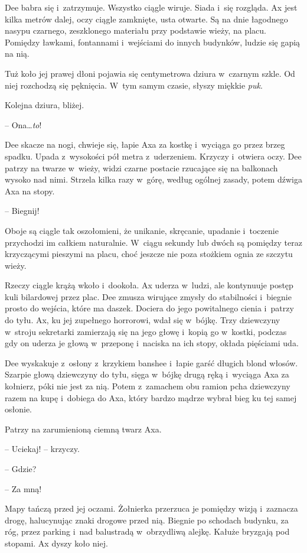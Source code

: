 \documentclass[oneside,polish,11pt,sfheadings]{mwbk}
\begin{document}
Dee babra się i~zatrzymuje. Wszystko ciągle wiruje. Siada i~się
rozgląda. Ax jest kilka metrów dalej, oczy ciągle zamknięte, usta
otwarte. Są na dnie łagodnego nasypu czarnego, zeszklonego materiału
przy podstawie wieży, na placu. Pomiędzy ławkami, fontannami i~wejściami
do innych budynków, ludzie się gapią na nią.

Tuż koło jej prawej dłoni pojawia się centymetrowa dziura w~czarnym
szkle. Od niej rozchodzą się pęknięcia. W~tym samym czasie, słyszy
miękkie \emph{puk}.

Kolejna dziura, bliżej.

-- Ona\ldots \emph{to}!

Dee skacze na nogi, chwieje się, łapie Axa za kostkę i~wyciąga go przez
brzeg spadku. Upada z~wysokości pół metra z~uderzeniem. Krzyczy i~otwiera oczy. Dee patrzy na twarze w~wieży, widzi czarne postacie
rzucające się na balkonach wysoko nad nimi. Strzela kilka razy w~górę,
według ogólnej zasady, potem dźwiga Axa na stopy.

-- Biegnij!

Oboje są ciągle tak oszołomieni, że unikanie, skręcanie, upadanie i~toczenie przychodzi im całkiem naturalnie. W~ciągu sekundy lub dwóch są
pomiędzy teraz krzyczącymi pieszymi na placu, choć jeszcze nie poza
stożkiem ognia ze szczytu wieży.

Rzeczy ciągle krążą wkoło i~dookoła. Ax uderza w~ludzi, ale kontynuuje
postęp kuli bilardowej przez plac. Dee zmusza wirujące zmysły do
stabilności i~biegnie prosto do wejścia, które ma daszek. Dociera do
jego powitalnego cienia i~patrzy do tyłu. Ax, ku jej zupełnego
horrorowi, wdał się w~bójkę. Trzy dziewczyny w~stroju sekretarki
zamierzają się na jego głowę i~kopią go w~kostki, podczas gdy on uderza
je głową w~przeponę i~naciska na ich stopy, okłada pięściami uda.

Dee wyskakuje z~osłony z~krzykiem banshee i~łapie garść długich blond
włosów. Szarpie głową dziewczyny do tyłu, sięga w~bójkę drugą ręką i~wyciąga Axa za kołnierz, póki nie jest za nią. Potem z~zamachem obu
ramion pcha dziewczyny razem na kupę i~dobiega do Axa, który bardzo
mądrze wybrał bieg ku tej samej osłonie.

Patrzy na zarumienioną ciemną twarz Axa.

-- Uciekaj! -- krzyczy.

-- Gdzie?

-- Za mną!

Mapy tańczą przed jej oczami. Żołnierka przerzuca je pomiędzy wizją i~zaznacza drogę, halucynując znaki drogowe przed nią. Biegnie po schodach
budynku, za róg, przez parking i~nad balustradą w~obrzydliwą alejkę.
Kałuże bryzgają pod stopami. Ax dyszy koło niej.
\end{document}
